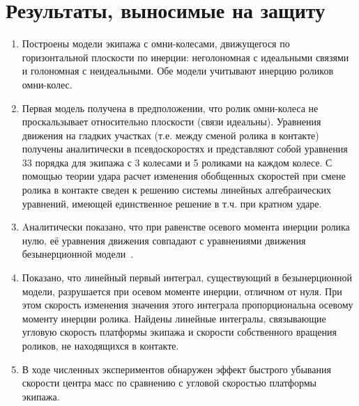 \chapter*{\vspace{-75pt}Результаты, выносимые на защиту}

\begin{enumerate}

        \item {
            Построены модели экипажа с омни-колесами, движущегося по горизонтальной плоскости по инерции: неголономная с идеальными связями и голономная с неидеальными. Обе модели учитывают инерцию роликов омни-колес.
        }

        \item {
            Первая модель получена в предположении, что ролик омни-колеса не проскальзывает относительно плоскости (связи идеальны). Уравнения движения на гладких участках  (т.е. между сменой ролика в контакте) получены аналитически в псевдоскоростях и представляют собой уравнения 33 порядка для экипажа с 3 колесами и 5 роликами на каждом колесе. С помощью теории удара расчет изменения обобщенных скоростей при смене ролика в контакте сведен к решению системы линейных алгебраических уравнений, имеющей единственное решение в т.ч. при кратном ударе.
        }

        \item {
            Aналитически показано, что при равенстве осевого момента инерции ролика нулю, её уравнения движения совпадают с уравнениями движения безынерционной модели~\cite{Zobova2011}.
        }

        \item {
            Показано, что линейный первый интеграл, существующий в безынерционной модели, разрушается при осевом моменте инерции, отличном от нуля. При этом скорость изменения значения этого интеграла пропорциональна осевому моменту инерции ролика. Найдены линейные интегралы, связывающие угловую скорость платформы экипажа и скорости собственного вращения роликов, не находящихся в контакте.
        }
        
        \item {
            В ходе численных экспериментов обнаружен эффект быстрого убывания скорости центра масс по сравнению с угловой скоростью платформы экипажа.
        }
        

\end{enumerate}
